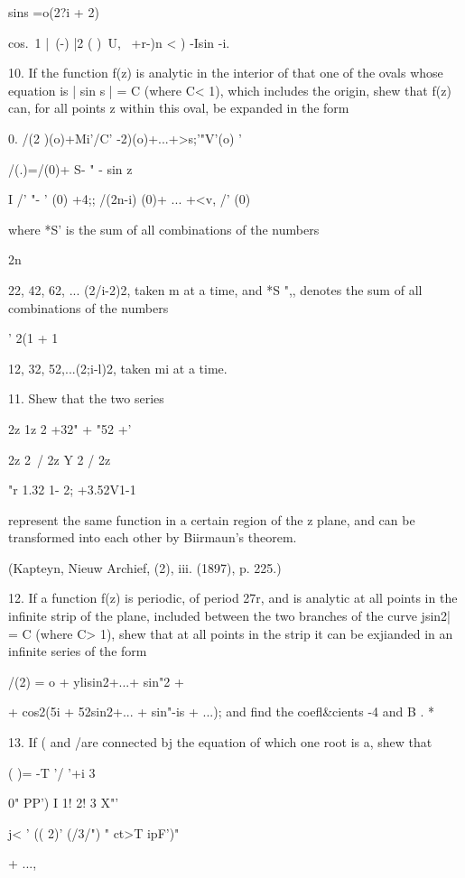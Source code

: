 {{sins =o(2?i + 2)

cos.\ 1 |\ (-) |2 ( )\ U, \ +r-)n < ) -Isin -i.


10. If the function f(z) is analytic in the interior of that one of
the ovals whose equation is | sin s | = C (where C< 1), which includes
the origin, shew that f(z) can, for all points z within this oval, be
expanded in the form

0. /(2 )(o)+Mi'/C' -2)(o)+...+>s;'"V'(o) '

/(.)=/(0)+ S- " - sin z

I /' "- ' (0) +4;; /(2n-i) (0)+ ... +<v, /' (0)

where *S' is the sum of all combinations of the numbers

2n

22, 42, 62, ... (2/i-2)2, taken m at a time, and *S ",, denotes the
sum of all combinations of the numbers

' 2(1 + 1

12, 32, 52,...(2;i-l)2, taken mi at a time. 

11. Shew that the two series

2z 1z 2 +32" + "52 +'

2z 2\ / 2z Y 2 / 2z

 "r 1.32 1- 2; +3.52V1-1

represent the same function in a certain region of the z plane, and
can be transformed into each other by Biirmaun's theorem.

(Kapteyn, Nieuw Archief, (2), iii. (1897), p. 225.)

12. If a function f(z) is periodic, of period 27r, and is analytic at
all points in the infinite strip of the plane, included between the
two branches of the curve jsin2| = C (where C> 1), shew that at all
points in the strip it can be exjianded in an infinite series of the
form

/(2) = o + ylisin2+...+ sin"2 +

+ cos2(5i + 52sin2+... + sin"-is + ...); and find the coefl\&cients
-4 and B . *

%
%

13. If ( and /are connected bj the equation of which one root is a,
shew that

 ( )= -T '/ '+i 3

0" PP') I 1! 2! 3 X"'

j< ' (( 2)' (/3/") " ct>T ipF')"

+ ...,

}}
